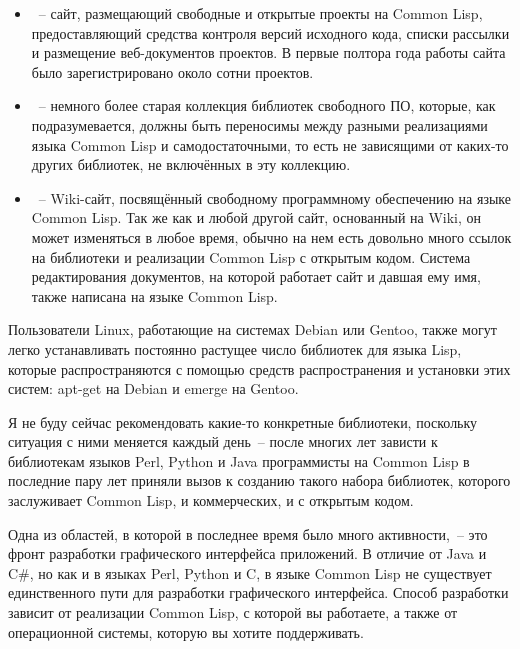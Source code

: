 \begin{itemize}
\item {}~-- сайт, размещающий свободные
  и открытые проекты на Common Lisp, предоставляющий средства контроля версий исходного кода,
  списки рассылки и размещение веб-документов проектов. В первые полтора года работы сайта
  было зарегистрировано около сотни проектов.

\item {}~-- немного более старая коллекция библиотек
  свободного ПО, которые, как подразумевается, должны быть переносимы между разными
  реализациями языка Common Lisp и самодостаточными, то есть не зависящими от каких-то
  других библиотек, не включённых в эту коллекцию.

\item {}~-- Wiki-сайт, посвящённый
  свободному программному обеспечению на языке Common Lisp. Так же как и любой другой
  сайт, основанный на Wiki, он может изменяться в любое время, обычно на нем есть довольно
  много ссылок на библиотеки и реализации Common Lisp с открытым кодом. Система
  редактирования документов, на которой работает сайт и давшая ему имя, также написана на
  языке Common Lisp.
\end{itemize}

Пользователи Linux, работающие на системах Debian или Gentoo, также могут легко
устанавливать постоянно растущее число библиотек для языка Lisp, которые распространяются
с помощью средств распространения и установки этих систем: apt-get на Debian и emerge на
Gentoo.

Я не буду сейчас рекомендовать какие-то конкретные библиотеки, поскольку ситуация с ними
меняется каждый день~-- после многих лет зависти к библиотекам языков Perl, Python и
Java программисты на Common Lisp в последние пару лет приняли вызов к созданию такого
набора библиотек, которого заслуживает Common Lisp, и коммерческих, и с открытым кодом.

Одна из областей, в которой в последнее время было много активности,~-- это фронт
разработки графического интерфейса приложений. В отличие от Java и C\#, но как и в языках
Perl, Python и C, в языке Common Lisp не существует единственного пути для разработки
графического интерфейса. Способ разработки зависит от реализации Common Lisp, с которой вы
работаете, а также от операционной системы, которую вы хотите поддерживать.

